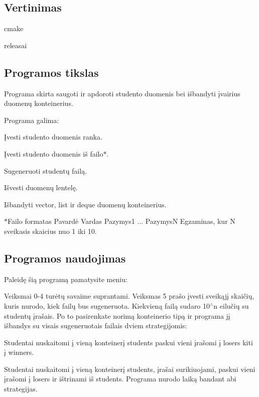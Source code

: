 \subsection*{Vertinimas}


\begin{DoxyItemize}
\item cmake
\item releasai
\end{DoxyItemize}

\subsection*{Programos tikslas}

Programa skirta saugoti ir apdoroti studento duomenis bei išbandyti įvairius duomenų konteinerius.

Programa galima\+:
\begin{DoxyEnumerate}
\item Įvesti studento duomenis ranka.
\item Įvesti studento duomenis iš failo$\ast$.
\item Sugeneruoti studentų failą.
\item Išvesti duomenų lentelę.
\item Išbandyti {\ttfamily vector}, {\ttfamily list} ir {\ttfamily deque} duomenų konteinerius.
\end{DoxyEnumerate}

$\ast$\+Failo formatas Pavardė Vardas Pazymys1 ... PazymysN Egzaminas, kur N sveikasis skaicius nuo 1 iki 10.

\subsection*{Programos naudojimas}

Paleidę šią programą pamatysite meniu\+:



Veiksmai 0-\/4 turėtų savaime suprantami. Veiksmas 5 prašo įvesti sveikąjį skaičių, kuris nurodo, kiek failų bus sugeneruota. Kiekvieną failą sudaro 10$^\wedge$n eilučių su studentų įrašais. Po to pasirenkate norimą konteinerio tipą ir programa jį išbandys su visais sugeneruotais failais dviem strategijomis\+:
\begin{DoxyEnumerate}
\item Studentai nuskaitomi į vieną konteinerį {\ttfamily students} paskui vieni įrašomi į {\ttfamily losers} kiti į {\ttfamily winners}.
\item Studentai nuskaitomi į vieną konteinerį {\ttfamily students}, įrašai surikiuojami, paskui vieni įrašomi į {\ttfamily losers} ir ištrinami iš {\ttfamily students}. Programa nurodo laiką bandant abi strategijas.
\end{DoxyEnumerate}

